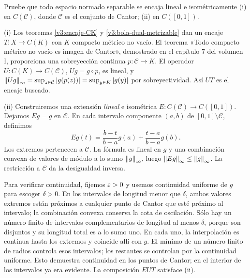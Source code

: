 \begin{ejercicio}\label{ej:v3-l16-6}
Pruebe que todo espacio normado separable se encaja lineal e isométricamente (i) en $C(\mathcal C)$, donde $\mathcal C$ es el conjunto de Cantor; (ii) en $C([0,1])$.
\end{ejercicio}
\begin{solucion}
(i) Los teoremas \ref{v3:encaje-CK} y \ref{v3:bola-dual-metrizable} dan un encaje $T:X\to C(K)$ con $K$ compacto métrico no vacío. El teorema «Todo compacto métrico no vacío es imagen de Cantor», demostrado en el capítulo 7 del volumen I, proporciona una sobreyección continua $p:\mathcal C\to K$. El operador $U:C(K)\to C(\mathcal C)$, $Ug=g\circ p$, es lineal, y
$\left\lVert Ug\right\rVert_\infty=\sup_{z\in\mathcal C}|g(p(z))|=\sup_{y\in K}|g(y)|$ por sobreyectividad. Así $UT$ es el encaje buscado.

(ii) Construiremos una extensión \emph{lineal} e isométrica $E:C(\mathcal C)\to C([0,1])$. Dejamos $Eg=g$ en $\mathcal C$. En cada intervalo componente $(a,b)$ de $[0,1]\setminus\mathcal C$, definimos
\[
 Eg(t)=\frac{b-t}{b-a}g(a)+\frac{t-a}{b-a}g(b).
\]
Los extremos pertenecen a $\mathcal C$. La fórmula es lineal en $g$ y una combinación convexa de valores de módulo a lo sumo $\left\lVert g\right\rVert_\infty$, luego $\left\lVert Eg\right\rVert_\infty\leq\left\lVert g\right\rVert_\infty$. La restricción a $\mathcal C$ da la desigualdad inversa.

Para verificar continuidad, fijemos $\varepsilon>0$ y usemos continuidad uniforme de $g$ para escoger $\delta>0$. En los intervalos de longitud menor que $\delta$, ambos valores extremos están próximos a cualquier punto de Cantor que esté próximo al intervalo; la combinación convexa conserva la cota de oscilación. Sólo hay un número finito de intervalos complementarios de longitud al menos $\delta$, porque son disjuntos y su longitud total es a lo sumo uno. En cada uno, la interpolación es continua hasta los extremos y coincide allí con $g$. El mínimo de un número finito de radios controla esos intervalos; los restantes se controlan por la continuidad uniforme. Esto demuestra continuidad en los puntos de Cantor; en el interior de los intervalos ya era evidente. La composición $EUT$ satisface (ii).
\end{solucion}

